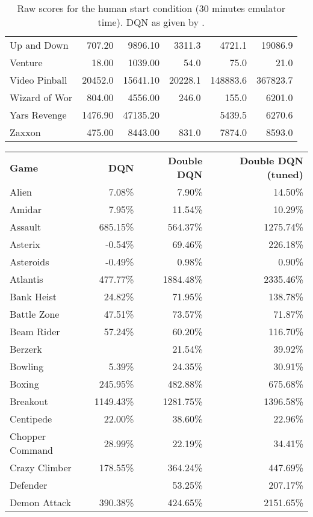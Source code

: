 \documentclass[letterpaper]{article}
\begin{document}
\begin{table*}[h]
\begin{tabular}{lrrrrr}
Up and Down & 707.20 & 9896.10 & 3311.3 & 4721.1 & 19086.9 \\
Venture & 18.00 & 1039.00 & 54.0 & 75.0 & 21.0 \\
Video Pinball & 20452.0 & 15641.10 & 20228.1 & 148883.6 & 367823.7 \\
Wizard of Wor & 804.00 & 4556.00 & 246.0 & 155.0 & 6201.0 \\
Yars Revenge & 1476.90 & 47135.20 &  & 5439.5 & 6270.6 \\
Zaxxon & 475.00 & 8443.00 & 831.0 & 7874.0 & 8593.0 \\
\end{tabular}
\caption{Raw scores for the human start condition (30 minutes emulator time). DQN as given by \citet{Nair:2015}.}
\end{table*}

\begin{table*}[h]
\centering
\begin{tabular}{lrrr}
\textbf{Game} & \textbf{DQN} & \textbf{Double DQN} & \textbf{Double DQN (tuned)} \\
Alien & 7.08\% & 7.90\% & 14.50\% \\
Amidar & 7.95\% & 11.54\% & 10.29\% \\
Assault & 685.15\% & 564.37\% & 1275.74\% \\
Asterix & -0.54\% & 69.46\% & 226.18\% \\
Asteroids & -0.49\% & 0.98\% & 0.90\% \\
Atlantis & 477.77\% & 1884.48\% & 2335.46\% \\
Bank Heist & 24.82\% & 71.95\% & 138.78\% \\
Battle Zone & 47.51\% & 73.57\% & 71.87\% \\
Beam Rider & 57.24\% & 60.20\% & 116.70\% \\
Berzerk &  & 21.54\% & 39.92\% \\
Bowling & 5.39\% & 24.35\% & 30.91\% \\
Boxing & 245.95\% & 482.88\% & 675.68\% \\
Breakout & 1149.43\% & 1281.75\% & 1396.58\% \\
Centipede & 22.00\% & 38.60\% & 22.96\% \\
Chopper Command & 28.99\% & 22.19\% & 34.41\% \\
Crazy Climber & 178.55\% & 364.24\% & 447.69\% \\
Defender &  & 53.25\% & 207.17\% \\
Demon Attack & 390.38\% & 424.65\% & 2151.65\% \\

\end{tabular}
\end{table*}
\end{document}

